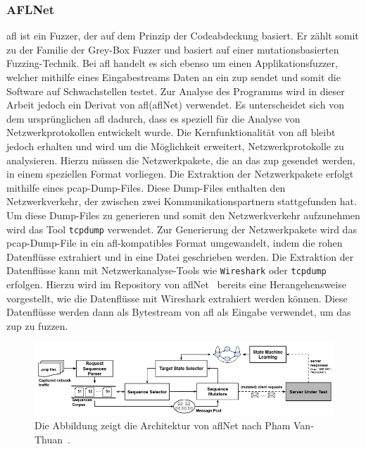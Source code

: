 \subsubsection{AFLNet}\label{subsubsec:aflnet}
\gls{afl} ist ein Fuzzer, der auf dem Prinzip der Codeabdeckung basiert.
Er zählt somit zu der Familie der Grey-Box Fuzzer und basiert auf einer mutationsbasierten Fuzzing-Technik.
Bei \gls{afl} handelt es sich ebenso um einen Applikationsfuzzer, welcher mithilfe eines Eingabestreams Daten
an ein \gls{zup} sendet und somit die Software auf Schwachstellen testet.\newline
Zur Analyse des Programms wird in dieser Arbeit jedoch ein Derivat von \gls{afl}(\gls{afl}Net) verwendet.
Es unterscheidet sich von dem ursprünglichen \gls{afl} dadurch, dass es speziell für die Analyse von Netzwerkprotokollen
entwickelt wurde.
Die Kernfunktionalität von \gls{afl} bleibt jedoch erhalten und wird um die Möglichkeit erweitert, Netzwerkprotokolle zu
analysieren.\newline
Hierzu müssen die Netzwerkpakete, die an das \gls{zup} gesendet werden, in einem speziellen Format vorliegen.
Die Extraktion der Netzwerkpakete erfolgt mithilfe eines \gls{pcap}-Dump-Files.
Diese Dump-Files enthalten den Netzwerkverkehr, der zwischen zwei Kommunikationspartnern stattgefunden hat.
Um diese Dump-Files zu generieren und somit den Netzwerkverkehr aufzunehmen wird das Tool \texttt{tcpdump} verwendet.
Zur Generierung der Netzwerkpakete wird das \gls{pcap}-Dump-File in ein \gls{afl}-kompatibles Format umgewandelt, indem
die rohen Datenflüsse extrahiert und in eine Datei geschrieben werden.
Die Extraktion der Datenflüsse kann mit Netzwerkanalyse-Tools wie \texttt{Wireshark} oder \texttt{tcpdump} erfolgen.
Hierzu wird im Repository von \gls{afl}Net~\cite{aflnet-repo} bereits eine Herangehensweise vorgestellt, wie die Datenflüsse mit
Wireshark extrahiert werden können.
Diese Datenflüsse werden dann als Bytestream von \gls{afl} als Eingabe verwendet, um das \gls{zup} zu fuzzen.
\begin{figure}[H]
    \centering
    \includegraphics[width=\textwidth]{img/aflnet_arch}
    \caption[Architektur des AFLNet Fuzzers]{Die Abbildung zeigt die Architektur von \gls{afl}Net nach Pham Van-Thuan~\cite{AFLNet}.}
    \label{fig:aflnet_architecture}
\end{figure}
